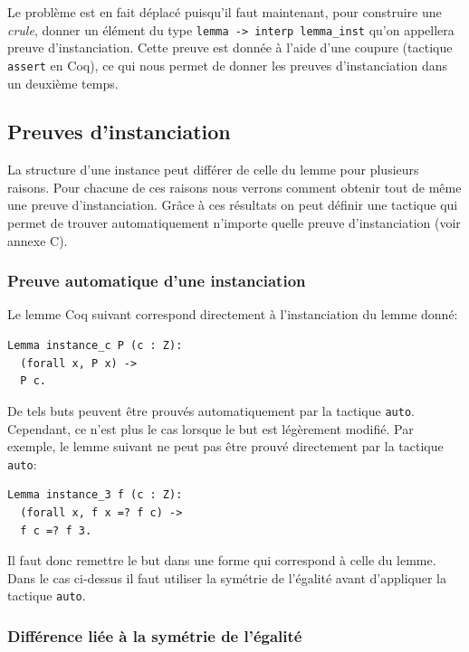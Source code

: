 \documentclass[11pt]{article}
\begin{document}
Le problème est en fait déplacé puisqu'il faut maintenant, pour construire une \textit{crule}, donner un élément du type \texttt{lemma -> interp lemma\_inst} qu'on appellera preuve d'instanciation. Cette preuve est donnée à l'aide d'une coupure (tactique \texttt{assert} en Coq), ce qui nous permet de donner les preuves d'instanciation dans un deuxième temps.

\subsection{Preuves d'instanciation} \label{preuve_instanciation}

La structure d'une instance peut différer de celle du lemme pour plusieurs raisons. Pour chacune de ces raisons nous verrons comment obtenir tout de même une preuve d'instanciation. Grâce à ces résultats on peut définir une tactique qui permet de trouver automatiquement n'importe quelle preuve d'instanciation (voir annexe C).

\subsubsection{Preuve automatique d'une instanciation} \label{preuve_auto}

Le lemme Coq suivant correspond directement à l'instanciation du lemme donné:
\begin{lstlisting}[frame=single]
Lemma instance_c P (c : Z): 
  (forall x, P x) ->
  P c.
\end{lstlisting}

De tels buts peuvent être prouvés automatiquement par la tactique \texttt{auto}. Cependant, ce n'est plus le cas lorsque le but est légèrement modifié. Par exemple, le lemme suivant ne peut pas être prouvé directement par la tactique \texttt{auto}:

\begin{lstlisting}[frame=single]
Lemma instance_3 f (c : Z): 
  (forall x, f x =? f c) ->
  f c =? f 3.
\end{lstlisting}
Il faut donc remettre le but dans une forme qui correspond à celle du lemme. Dans le cas ci-dessus il faut utiliser la symétrie de l'égalité avant d'appliquer la tactique \texttt{auto}.

\subsubsection{Différence liée à la symétrie de l'égalité}
\end{document}
